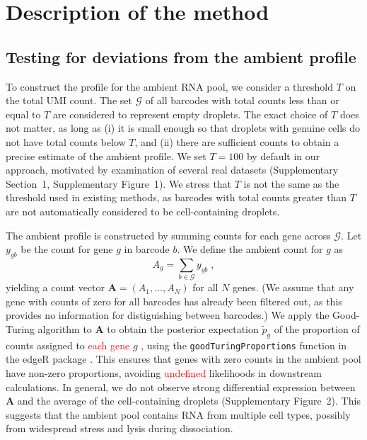 \documentclass[10pt,letterpaper]{article}
\newcommand{\code}[1]{\texttt{#1}}
\newcommand{\revised}[1]{\textcolor{red}{#1}}
\newcommand{\suppfignegative}{1}
\newcommand{\suppfigambientma}{2}
\newcommand{\suppsecthreshold}{1}
\begin{document}
\section*{Description of the method}

\subsection*{Testing for deviations from the ambient profile}
To construct the profile for the ambient RNA pool, we consider a threshold $T$ on the total UMI count.
The set $\mathcal{G}$ of all barcodes with total counts less than or equal to $T$ are considered to represent empty droplets.
The exact choice of $T$ does not matter, as long as (i) it is small enough so that droplets with genuine cells do not have total counts below $T$,
and (ii) there are sufficient counts to obtain a precise estimate of the ambient profile.
We set $T=100$ by default in our approach, motivated by examination of several real datasets (Supplementary Section~\suppsecthreshold{}, Supplementary Figure~\suppfignegative{}).
We stress that $T$ is not the same as the threshold used in existing methods, as barcodes with total counts greater than $T$ are not automatically considered to be cell-containing droplets.

The ambient profile is constructed by summing counts for each gene across $\mathcal{G}$.
Let $y_{gb}$ be the count for gene $g$ in barcode $b$.
We define the ambient count for $g$ as 
\[
    A_{g} = \sum_{b \in \mathcal{G}} y_{gb} \;,
\]
yielding a count vector $\mathbf{A} = (A_1, \dots, A_N)$ for all $N$ genes.
(We assume that any gene with counts of zero for all barcodes has already been filtered out, as this provides no information for distiguishing between barcodes.)
We apply the Good-Turing algorithm to $\mathbf{A}$ to obtain the posterior expectation $\tilde{p}_g$ of the proportion of counts assigned to \revised{each gene} $g$ \cite{gale1995good}, using the \code{goodTuringProportions} function in the \textsf{edgeR} package \cite{robinson2010edgeR}.
This ensures that genes with zero counts in the ambient pool have non-zero proportions, avoiding \revised{undefined} likelihoods in downstream calculations.
In general, we do not observe strong differential expression between $\mathbf{A}$ and the average of the cell-containing droplets (Supplementary Figure~\suppfigambientma{}).
This suggests that the ambient pool contains RNA from multiple cell types, possibly from widespread stress and lysis during dissociation.
\end{document}
